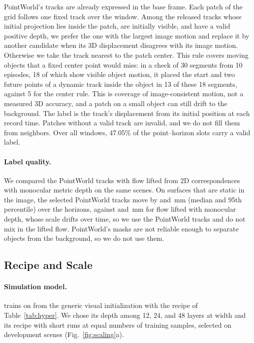 PointWorld's tracks are already expressed in the base frame. Each patch of the
\cfgContextGrid{} grid follows one fixed track over the window. Among the released
tracks whose initial projection lies inside the patch, are initially visible, and
have a valid positive depth, we prefer the one with the largest image motion and
replace it by another candidate when its 3D displacement disagrees with its image
motion. Otherwise we take the track nearest to the patch center. This rule covers
moving objects that a fixed center point would miss: in a check of 30 segments from
10 episodes, 18 of which show visible object motion, it placed the start and two
future points of a dynamic track inside the object in 13 of these 18 segments,
against 5 for the center rule. This is
coverage of image-consistent motion, not a measured 3D accuracy, and a patch on a
small object can still drift to the background. The label is the track's
displacement from its initial position at each record time. Patches without a
valid track are invalid, and we do not fill them from neighbors. Over all windows,
47.05\% of the point--horizon slots carry a valid label.

\paragraph{Label quality.} We compared the PointWorld tracks with flow lifted from 2D
correspondences \cite{dpflow} with monocular metric depth \cite{moge2} on the same
scenes. On surfaces that are static in the image, the selected PointWorld tracks
move by  and \,mm (median and 95th percentile) over the
horizons, against  and \,mm for flow lifted with monocular
depth, whose scale drifts over time, so we use the PointWorld tracks and do not mix
in the lifted flow. PointWorld's masks are not reliable enough to separate objects
from the background, so we do not use them.

\subsection{Recipe and Scale}
\label{app:scale}
\paragraph{Simulation model.} \ours trains on \bench from the generic visual
initialization with the recipe of Table~\ref{tab:hyper}. We chose its depth among
12, 24, and 48 layers at width \cfgWidth{} and its recipe with short runs at equal
numbers of training samples, selected on development scenes
(Fig.~\ref{fig:scaling}a).

